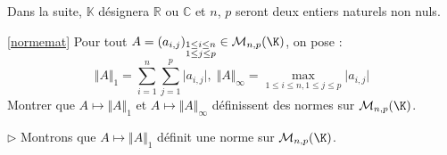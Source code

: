 \documentclass[a4paper,10pt]{report}
\begin{document}
\everymath{\displaystyle}

\begin{center}
\end{center}


\bigskip

\noindent Dans la suite, $\mathbb{K}$ désignera $\mathbb{R}$ ou $\mathbb{C}$ et $n$, $p$ seront deux entiers naturels non nuls.

\medskip

\begin{Exercice}{}\ref{normemat} Pour tout $A = (a_{i,j})_{\substack{1 \leq i \leq n \\ 1 \leq j \leq p}} \in \mathcal{M}_{n,p}(\K)$, on pose :
$$\Vert A \Vert_{1}  = \sum_{i = 1}^{n} \sum_{j = 1}^{p} \vert a_{i,j} \vert, \; \Vert A \Vert_{\infty}  = \max_{1 \leq i \leq n,1 \leq j \leq p} \vert a_{i,j} \vert $$
Montrer que $A \mapsto \Vert A \Vert_{1}$ et $A \mapsto \Vert A \Vert_{\infty}$ définissent des normes sur $\mathcal{M}_{n,p}(\K)$.
\end{Exercice}

\corr 

\noindent $\rhd$ Montrons que $A \mapsto \Vert A \Vert_{1}$ définit une norme sur $\mathcal{M}_{n,p}(\K)$.
\end{document}
